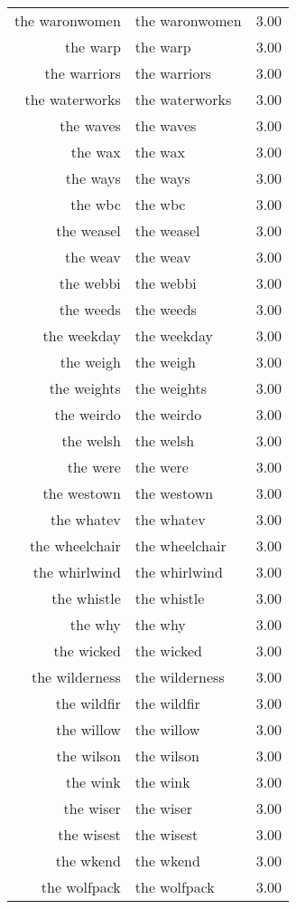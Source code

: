 \begin{table}[ht]
\begin{tabular}{rlr}
  the waronwomen & the waronwomen & 3.00 \\ 
  the warp & the warp & 3.00 \\ 
  the warriors & the warriors & 3.00 \\ 
  the waterworks & the waterworks & 3.00 \\ 
  the waves & the waves & 3.00 \\ 
  the wax & the wax & 3.00 \\ 
  the ways & the ways & 3.00 \\ 
  the wbc & the wbc & 3.00 \\ 
  the weasel & the weasel & 3.00 \\ 
  the weav & the weav & 3.00 \\ 
  the webbi & the webbi & 3.00 \\ 
  the weeds & the weeds & 3.00 \\ 
  the weekday & the weekday & 3.00 \\ 
  the weigh & the weigh & 3.00 \\ 
  the weights & the weights & 3.00 \\ 
  the weirdo & the weirdo & 3.00 \\ 
  the welsh & the welsh & 3.00 \\ 
  the were & the were & 3.00 \\ 
  the westown & the westown & 3.00 \\ 
  the whatev & the whatev & 3.00 \\ 
  the wheelchair & the wheelchair & 3.00 \\ 
  the whirlwind & the whirlwind & 3.00 \\ 
  the whistle & the whistle & 3.00 \\ 
  the why & the why & 3.00 \\ 
  the wicked & the wicked & 3.00 \\ 
  the wilderness & the wilderness & 3.00 \\ 
  the wildfir & the wildfir & 3.00 \\ 
  the willow & the willow & 3.00 \\ 
  the wilson & the wilson & 3.00 \\ 
  the wink & the wink & 3.00 \\ 
  the wiser & the wiser & 3.00 \\ 
  the wisest & the wisest & 3.00 \\ 
  the wkend & the wkend & 3.00 \\ 
  the wolfpack & the wolfpack & 3.00 \\ 

\end{tabular}
\end{table}
